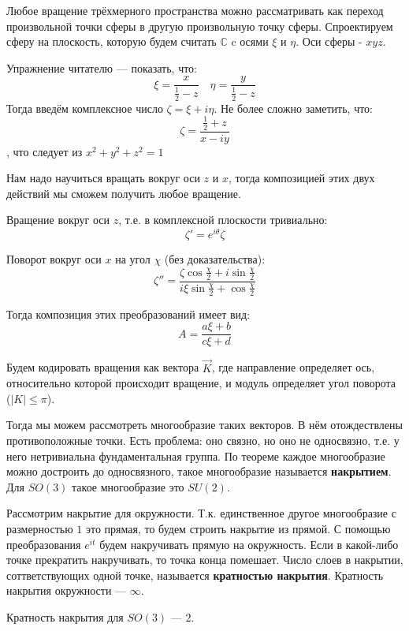 Любое вращение трёхмерного пространства можно рассматривать как переход произвольной точки сферы
в другую произвольную точку сферы.
Спроектируем сферу на плоскость, которую будем считать \(\mathbb{C}\) c осями \(\xi\) и \(\eta\). Оси сферы - \(xyz\).

Упражнение читателю --- показать, что:
\[\xi = \frac{x}{\frac{1}{2} - z} \quad \eta = \frac{y}{\frac{1}{2} - z}\]
Тогда введём комплексное число \(\zeta = \xi + i\eta\). Не более сложно заметить, что:
\[\zeta = \frac{\frac{1}{2} + z}{x - iy}\]
, что следует из \(x^2+y^2+z^2=1\)

Нам надо научиться вращать вокруг оси \(z\) и \(x\), тогда композицией этих двух действий мы сможем получить любое вращение.

Вращение вокруг оси \(z\), т.е. в комплексной плоскости тривиально:
\[\zeta' = e^{i\theta} \zeta\]

Поворот вокруг оси \(x\) на угол \(\chi\) (без доказательства):
\[\zeta'' = \frac{\zeta \cos \frac{\chi}{2} + i \sin \frac{\chi}{2}}{i \xi \sin \frac{\chi}{2} + \cos \frac{\chi}{2}}\]

Тогда композиция этих преобразований имеет вид:
\[A = \frac{a\xi + b}{c\xi + d}\]

Будем кодировать вращения как вектора \(\vec{K}\), где направление определяет ось,
относительно которой происходит вращение, и модуль определяет угол поворота (\(|K| \le \pi\)).

Тогда мы можем рассмотреть многообразие таких векторов. В нём отождествлены противоположные точки.
Есть проблема: оно связно, но оно не односвязно, т.е. у него нетривиальна фундаментальная группа.
По теореме каждое многообразие можно достроить до односвязного, такое многообразие называется \textbf{накрытием}.
Для \(SO(3)\) такое многообразие это \(SU(2)\).

\begin{example}
    Рассмотрим накрытие для окружности.
    Т.к. единственное другое многообразие с размерностью \(1\) это прямая, то будем строить накрытие из прямой.
    С помощью преобразования \(e^{it}\) будем накручивать прямую на окружность.
    Если в какой-либо точке прекратить накручивать, то точка конца помешает.
    Число слоев в накрытии, соттветствующих одной точке, называется \textbf{кратностью накрытия}.
    Кратность накрытия окружности --- \(\infty\).
\end{example}

Кратность накрытия для \(SO(3)\) --- \(2\).
